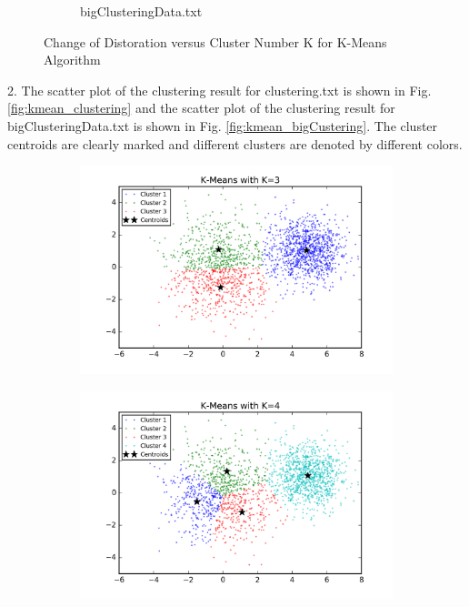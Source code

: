 \begin{description}
\begin{description}
\begin{figure}[H]
\begin{subfigure}[b]{0.49\textwidth}
            \caption{bigClusteringData.txt}\label{fig:1b}
        \end{subfigure}
\caption{Change of Distoration versus Cluster Number K for K-Means Algorithm}
\label{fig:k-means-loss} 
\end{figure}

\item{2.} The scatter plot of the clustering result for clustering.txt is shown in Fig. \ref{fig:kmean_clustering} and the scatter plot of the clustering result for bigClusteringData.txt is shown in Fig. \ref{fig:kmean_bigCustering}. The cluster centroids are clearly marked and different clusters are denoted by different colors. 

\begin{figure}[!h]
        \centering
        \begin{subfigure}[b]{0.475\textwidth}
            \centering
            \includegraphics[width=\textwidth]{./figures/clustering_kMeans_3.png}
        \end{subfigure}
        \hfill
        \begin{subfigure}[b]{0.475\textwidth}  
            \centering 
            \includegraphics[width=\textwidth]{./figures/clustering_kMeans_4.png}

\end{subfigure}
\end{figure}
\end{description}
\end{description}
